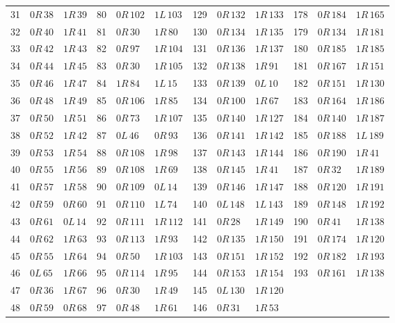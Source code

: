 \begin{longtable}{rll@{\quad}rll@{\quad}rll@{\quad}rll}
31 & $0R\,38$ & $1R\,39$ & 80 & $0R\,102$ & $1L\,103$ & 129 & $0R\,132$ & $1R\,133$ & 178 & $0R\,184$ & $1R\,165$\\
32 & $0R\,40$ & $1R\,41$ & 81 & $0R\,30$ & $1R\,80$ & 130 & $0R\,134$ & $1R\,135$ & 179 & $0R\,134$ & $1R\,181$\\
33 & $0R\,42$ & $1R\,43$ & 82 & $0R\,97$ & $1R\,104$ & 131 & $0R\,136$ & $1R\,137$ & 180 & $0R\,185$ & $1R\,185$\\
34 & $0R\,44$ & $1R\,45$ & 83 & $0R\,30$ & $1R\,105$ & 132 & $0R\,138$ & $1R\,91$ & 181 & $0R\,167$ & $1R\,151$\\
35 & $0R\,46$ & $1R\,47$ & 84 & $1R\,84$ & $1L\,15$ & 133 & $0R\,139$ & $0L\,10$ & 182 & $0R\,151$ & $1R\,130$\\
36 & $0R\,48$ & $1R\,49$ & 85 & $0R\,106$ & $1R\,85$ & 134 & $0R\,100$ & $1R\,67$ & 183 & $0R\,164$ & $1R\,186$\\
37 & $0R\,50$ & $1R\,51$ & 86 & $0R\,73$ & $1R\,107$ & 135 & $0R\,140$ & $1R\,127$ & 184 & $0R\,140$ & $1R\,187$\\
38 & $0R\,52$ & $1R\,42$ & 87 & $0L\,46$ & $0R\,93$ & 136 & $0R\,141$ & $1R\,142$ & 185 & $0R\,188$ & $1L\,189$\\
39 & $0R\,53$ & $1R\,54$ & 88 & $0R\,108$ & $1R\,98$ & 137 & $0R\,143$ & $1R\,144$ & 186 & $0R\,190$ & $1R\,41$\\
40 & $0R\,55$ & $1R\,56$ & 89 & $0R\,108$ & $1R\,69$ & 138 & $0R\,145$ & $1R\,41$ & 187 & $0R\,32$ & $1R\,189$\\
41 & $0R\,57$ & $1R\,58$ & 90 & $0R\,109$ & $0L\,14$ & 139 & $0R\,146$ & $1R\,147$ & 188 & $0R\,120$ & $1R\,191$\\
42 & $0R\,59$ & $0R\,60$ & 91 & $0R\,110$ & $1L\,74$ & 140 & $0L\,148$ & $1L\,143$ & 189 & $0R\,148$ & $1R\,192$\\
43 & $0R\,61$ & $0L\,14$ & 92 & $0R\,111$ & $1R\,112$ & 141 & $0R\,28$ & $1R\,149$ & 190 & $0R\,41$ & $1R\,138$\\
44 & $0R\,62$ & $1R\,63$ & 93 & $0R\,113$ & $1R\,93$ & 142 & $0R\,135$ & $1R\,150$ & 191 & $0R\,174$ & $1R\,120$\\
45 & $0R\,55$ & $1R\,64$ & 94 & $0R\,50$ & $1R\,103$ & 143 & $0R\,151$ & $1R\,152$ & 192 & $0R\,182$ & $1R\,193$\\
46 & $0L\,65$ & $1R\,66$ & 95 & $0R\,114$ & $1R\,95$ & 144 & $0R\,153$ & $1R\,154$ & 193 & $0R\,161$ & $1R\,138$\\
47 & $0R\,36$ & $1R\,67$ & 96 & $0R\,30$ & $1R\,49$ & 145 & $0L\,130$ & $1R\,120$ &  &  & \\
48 & $0R\,59$ & $0R\,68$ & 97 & $0R\,48$ & $1R\,61$ & 146 & $0R\,31$ & $1R\,53$ &  &  & \\
\end{longtable}
\endgroup
